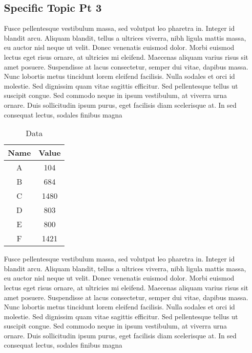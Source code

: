\documentclass[linenumbers,RNAAS,trackchanges]{aastex631}
\begin{document}
\subsection{Specific Topic Pt 3} \label{sec:subtopic3}
Fusce pellentesque vestibulum massa, sed volutpat leo pharetra in. Integer id blandit arcu. Aliquam blandit, tellus a ultrices viverra, nibh ligula mattis massa, eu auctor nisl neque ut velit. Donec venenatis euismod dolor. Morbi euismod lectus eget risus ornare, at ultricies mi eleifend. Maecenas aliquam varius risus sit amet posuere. Suspendisse at lacus consectetur, semper dui vitae, dapibus massa. Nunc lobortis metus tincidunt lorem eleifend facilisis. Nulla sodales et orci id molestie. Sed dignissim quam vitae sagittis efficitur. Sed pellentesque tellus ut suscipit congue. Sed commodo neque in ipsum vestibulum, at viverra urna ornare. Duis sollicitudin ipsum purus, eget facilisis diam scelerisque at. In sed consequat lectus, sodales finibus magna

\begin{table}[H]
    \centering
    \begin{tabular}{|c|c|}
         \hline
         Name &  Value \\
         \hline
         A & 104 \\
         B & 684 \\
         C & 1480 \\
         D & 803 \\
         E & 800 \\
         F & 1421 \\
         \hline
    \end{tabular}
    \caption{Data}
    \label{tab:data_tab}
\end{table}

Fusce pellentesque vestibulum massa, sed volutpat leo pharetra in. Integer id blandit arcu. Aliquam blandit, tellus a ultrices viverra, nibh ligula mattis massa, eu auctor nisl neque ut velit. Donec venenatis euismod dolor. Morbi euismod lectus eget risus ornare, at ultricies mi eleifend. Maecenas aliquam varius risus sit amet posuere. Suspendisse at lacus consectetur, semper dui vitae, dapibus massa. Nunc lobortis metus tincidunt lorem eleifend facilisis. Nulla sodales et orci id molestie. Sed dignissim quam vitae sagittis efficitur. Sed pellentesque tellus ut suscipit congue. Sed commodo neque in ipsum vestibulum, at viverra urna ornare. Duis sollicitudin ipsum purus, eget facilisis diam scelerisque at. In sed consequat lectus, sodales finibus magna
\end{document}
